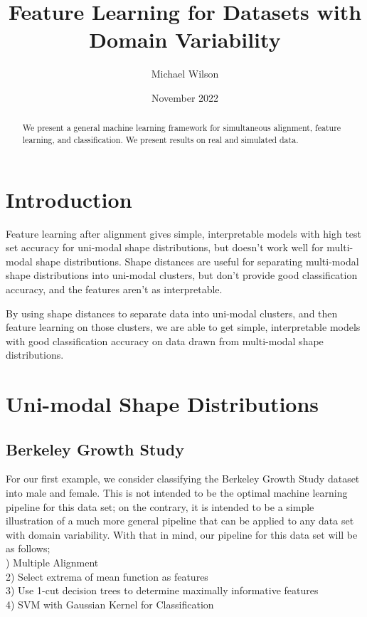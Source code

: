 \documentclass[]{article}
\title{Feature Learning for Datasets with Domain Variability}
\author{Michael Wilson}
\date{November 2022}
\begin{document}
\maketitle

\begin{abstract}
We present a general machine learning framework for simultaneous alignment, feature learning, and classification. We present results on real and simulated data.  
\end{abstract}

\section{Introduction}

Feature learning after alignment gives simple, interpretable models with high test set accuracy for uni-modal shape distributions, but doesn't work well for multi-modal shape distributions. Shape distances are useful for separating multi-modal shape distributions into uni-modal clusters, but don't provide good classification accuracy, and the features aren't as interpretable. 

By using shape distances to separate data into uni-modal clusters, and then feature learning on those clusters, we are able to get simple, interpretable models with good classification accuracy on data drawn from multi-modal shape distributions. 

\section{Uni-modal Shape Distributions}

\subsection{Berkeley Growth Study}

For our first example, we consider classifying the Berkeley Growth Study dataset into male and female. This is not intended to be the optimal machine learning pipeline for this data set; on the contrary, it is intended to be a simple illustration of a much more general pipeline that can be applied to any data set with domain variability. With that in mind, our pipeline for this data set will be as follows;\\

) Multiple Alignment\\
2) Select extrema of mean function as features\\
3) Use 1-cut decision trees to determine maximally informative features\\
4) SVM with Gaussian Kernel for Classification\\
\end{document}
